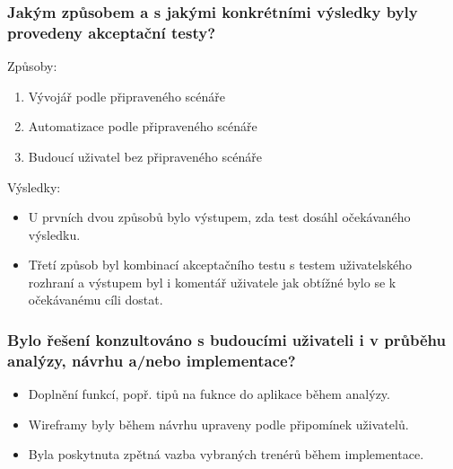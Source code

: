 \documentclass{beamer}
\begin{document}
\begin{frame}
  \frametitle{Jakým způsobem a s jakými konkrétními výsledky byly provedeny akceptační testy?}

  Způsoby:

  \begin{enumerate}
    \item Vývojář podle připraveného scénáře
    \item Automatizace podle připraveného scénáře
    \item Budoucí uživatel bez připraveného scénáře
  \end{enumerate}

  Výsledky:

  \begin{itemize}
    \item U prvních dvou způsobů bylo výstupem, zda test dosáhl očekávaného výsledku.
    \item Třetí způsob byl kombinací akceptačního testu s testem uživatelského rozhraní a výstupem byl i komentář uživatele jak obtížné bylo se k očekávanému cíli dostat.
  \end{itemize}

\end{frame}
\begin{frame}
  \frametitle{Bylo řešení konzultováno s budoucími uživateli i v průběhu analýzy, návrhu a/nebo implementace?}

  \begin{itemize}
    \item Doplnění funkcí, popř. tipů na fuknce do aplikace během analýzy.
    \item Wireframy byly během návrhu upraveny podle připomínek uživatelů.
    \item Byla poskytnuta zpětná vazba vybraných trenérů během implementace.
  \end{itemize}
\end{frame}
\end{document}
